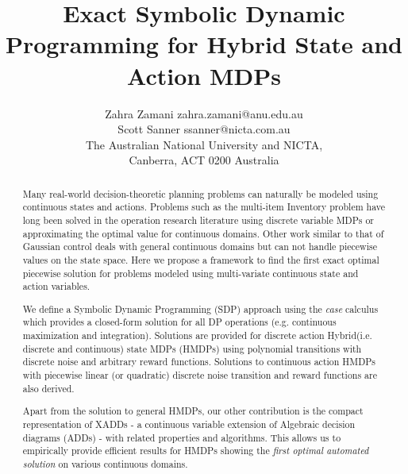 \documentclass[twoside,11pt]{article}
\begin{document}
\title{Exact Symbolic Dynamic Programming for Hybrid State and Action MDPs}

\author{\name Zahra Zamani \email zahra.zamani@anu.edu.au \\
       \name Scott Sanner \email ssanner@nicta.com.au \\
       \addr The Australian National University and NICTA,\\
       Canberra, ACT 0200 Australia       
}

\maketitle


\begin{abstract}
%
%
Many real-world decision-theoretic planning problems can naturally be
modeled using continuous states and actions. Problems such as the
multi-item Inventory problem \cite{Scarf_Karlin58} have long been
solved in the operation research literature using discrete variable
MDPs or approximating the optimal value for continuous domains. Other
work similar to that of Gaussian control deals with general continuous
domains but can not handle piecewise values on the state space. Here
we propose a framework to find the first exact optimal piecewise
solution for problems modeled using multi-variate continuous state and
action variables.

We define a Symbolic Dynamic Programming (SDP) approach using the
\emph{case} calculus which provides a closed-form solution for all DP
operations (e.g. continuous maximization and integration). Solutions
are provided for discrete action Hybrid(i.e. discrete and continuous)
state MDPs (HMDPs) using polynomial transitions with discrete noise
and arbitrary reward functions. Solutions to continuous action HMDPs
with piecewise linear (or quadratic) discrete noise transition and
reward functions are also derived.

Apart from the solution to general HMDPs, our other contribution is
the compact representation of XADDs - a continuous variable extension
of Algebraic decision diagrams (ADDs) - with related properties and
algorithms. This allows us to empirically provide efficient results
for HMDPs showing the \emph{first optimal automated solution} on
various continuous domains.
\end{abstract}
\end{document}
